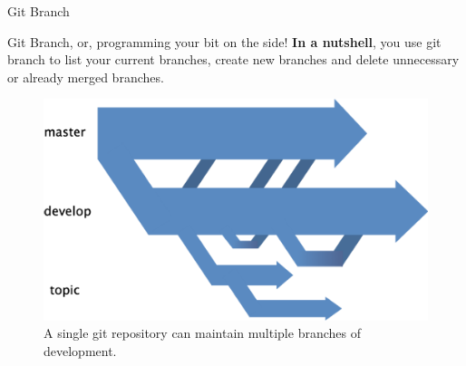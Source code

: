 \begin{frame}{Git Branch}
    \begin{block}{Git Branch, or, programming your bit on the side!}
    \textbf{In a nutshell}, you use git branch to list your current branches, create new branches and delete unnecessary or already merged branches. 
    \begin{figure}[ht]
        \centering
        \includegraphics[width=0.40\linewidth]{img/branching.png}
        \caption{A single git repository can maintain multiple branches of development.}
    \end{figure}
    \end{block}
\end{frame}

